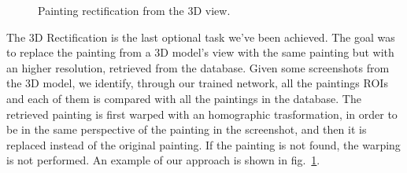 \begin{figure}[h!]
{{    \endminipage\hfill}
    }
    \caption{Painting rectification from the 3D view.}\label{fig:3d-warping}
\end{figure}


The 3D Rectification is the last optional task we've been achieved. The goal was to replace the painting from a 3D model's view with the same painting but with an higher resolution, retrieved from the database. Given some screenshots from the 3D model, we identify, through our trained network, all the paintings ROIs and each of them is compared with all the paintings in the database. The retrieved painting is first warped with an homographic trasformation, in order to be in the same perspective of the painting in the screenshot, and then it is replaced instead of the original painting. If the painting is not found, the warping is not performed. An example of our approach is shown in fig.~\ref{fig:3d-warping}.

